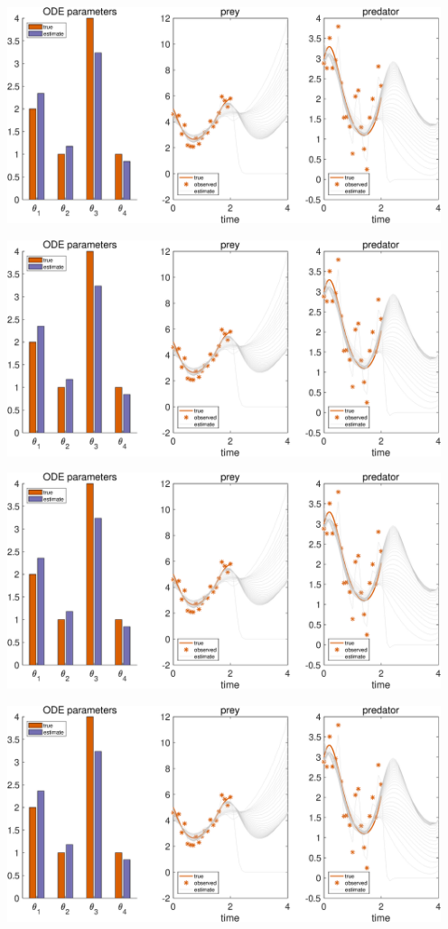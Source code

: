 {\includegraphics [width=5in]{Lotka_Volterra_3_37.eps}

\includegraphics [width=5in]{Lotka_Volterra_3_38.eps}

\includegraphics [width=5in]{Lotka_Volterra_3_39.eps}

\includegraphics [width=5in]{Lotka_Volterra_3_40.eps}

}
